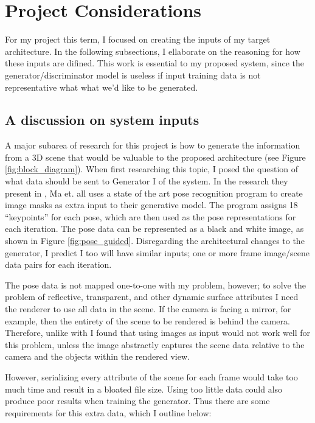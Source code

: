 \documentclass[conference]{IEEEtran}
\begin{document}
\section{Project Considerations}
\label{sec:considerations}
For my project this term, I focused on creating the inputs of my target
architecture. In the following subsections, I ellaborate
on the reasoning for how these inputs are difined. This work is essential to my
proposed system, since the generator/discriminator model is useless if input
training data is not representative what what we'd like to be generated.

\subsection{A discussion on system inputs}
\label{subsec:inputs}
A major subarea of research for this project is how to generate the
information from a 3D scene that would be valuable to the proposed architecture
(see Figure \ref{fig:block_diagram}).
When first researching this topic, I posed the question of what
data should be sent to Generator I of the system.
In the research they present in \cite{ref:pose_guided},
Ma et. all uses a state of the art pose recognition program to
create image masks as extra input to their generative model.
The program assigns 18 ``keypoints'' for each pose,
which are then used as the pose representations for each iteration.
The pose data can be represented as a black and white image,
as shown in Figure \ref{fig:pose_guided}.
Disregarding the architectural changes to the generator, I predict I too will
have similar inputs; one or more frame image/scene data pairs for each iteration.

The pose data is not mapped one-to-one with my problem, however;
to solve the problem of reflective, transparent, and other dynamic surface attributes
I need the renderer to use all data in the scene.
If the camera is facing a mirror, for example,
then the entirety of the scene to be rendered is behind the camera.
Therefore, unlike with \cite{ref:pose_guided}
I found that using images as input would not work well for this problem,
unless the image abstractly captures the scene data relative to the camera and
the objects within the rendered view.

However, serializing every attribute of the scene for each frame would take too much time
and result in a bloated file size.
Using too little data could also produce poor results when training the
generator. Thus there are some requirements for this extra data, which I
outline below:
\end{document}
